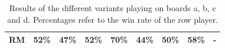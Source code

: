 \documentclass{article}
\begin{document}
\begin{table}[t]
\begin{tabular}{|c||c|c|c|c|c|c|c|c|}
        RM & 52\% & 47\% & 52\% & 70\% & 44\% & 50\% & 58\% &    - \\ \hline 
\end{tabular}
\caption{Results of the different variants playing on boards a, b, c and d. 
Percentages refer to the win rate of the row player. \label{table:round_robin}}
\end{table}
\end{document}
